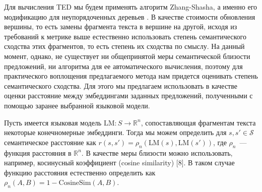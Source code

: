 \documentclass[12pt]{article}
\newcommand{\R}{\mathbb{R}}
\begin{document}
Для вычисления TED мы будем применять алгоритм Zhang-Shasha, а именно его модификацию для неупорядоченных деревьев \cite{zhang1992editing}. В качестве стоимости обновления вершины, то есть замены фрагмента текста в вершине на другой, исходя из требований к метрике выше естественно использовать степень семантического сходства этих фрагментов, то есть степень их сходства по смыслу. На данный момент, однако, не существует ни общепринятой меры семантической близости предложений, ни алгоритма для ее автоматического вычисления, поэтому для практического воплощения предлагаемого метода нам придется оценивать степень семантического сходства. Для этого мы предлагаем использовать в качестве оценки расстояние между эмбеддингами заданных предложений, полученными с помощью заранее выбранной языковой модели. 

Пусть имеется языковая модель $\text{LM}: S \rightarrow \R^n$, сопоставляющая фрагментам текста некоторые конечномерные эмбеддинги. Тогда мы можем определить для $s, s'\in\mathcal{S}$ семантическое расстояние как $r(s, s') = \rho_n(\text{LM}(s), \text{LM}(s'))$, где $\rho_n$~--- функция расстояния в $\R^n$. В качестве меры близости можно использовать, например, косинусный коэффициент (cosine similarity) [8]. В таком случае функцию расстояния естественно определить как $\rho_n(A, B) = 1 - \text{CosineSim}(A, B)$.
\end{document}

